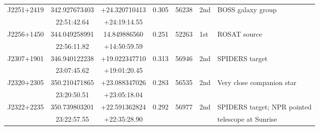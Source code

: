 \begin{table*}
\begin{tabular} {l  cc  cc l l}
\multirow{ 2}{*}{J2251+2419}   &  342.927673403   &  +24.320710413      &  \multirow{ 2}{*}{0.305} & \multirow{ 2}{*}{56238}    &   \multirow{ 2}{*}{2nd}     & BOSS galaxy  group \\
                                                 &  22:51:42.64         & +24:19:14.55           &                                      &                                         &               &          \\ 
\multirow{ 2}{*}{J2256+1450}   &   344.049258991   & 14.849886560        &\multirow{ 2}{*}{0.251}  & \multirow{ 2}{*}{52263}      &   \multirow{ 2}{*}{1st}      & ROSAT source          \\
                                                 & 22:56:11.82          & +14:50:59.59           &                                      &                                         &               &           \\  
\multirow{ 2}{*}{J2307+1901}    &   346.940122238  &  +19.022347710     &\multirow{ 2}{*}{0.313}  & \multirow{ 2}{*}{56946}     &   \multirow{ 2}{*}{2nd}s   & SPIDERS target \\
                                                  &   23:07:45.62       & +19:01:20.45          &                                      &                                          &              &                                            \\ 
\multirow{ 2}{*}{J2320+2305}    &  350.210471865  & +23.088347026       &  \multirow{ 2}{*}{0.283} & \multirow{ 2}{*}{56535}    &  \multirow{ 2}{*}{2nd}     & Very close companion star  \\
                                                 &   23:20:50.51        & +23:05:18.04           &                                      &                                         &              &                                            \\  
\multirow{ 2}{*}{J2322+2235}   &   350.739803201   &   +22.591362824    &\multirow{ 2}{*}{0.292}   & \multirow{ 2}{*}{56977}   & \multirow{ 2}{*}{2nd}       & SPIDERS target; NPR pointed \\
                                                 &    23:22:57.55        &  +22:35:28.90	     &                                      &                                         &               & telescope at Sunrise             \\ 
\hline 
\hline
\end{tabular}
\caption{}
      \label{tab:list_of_targets}
\end{table*}